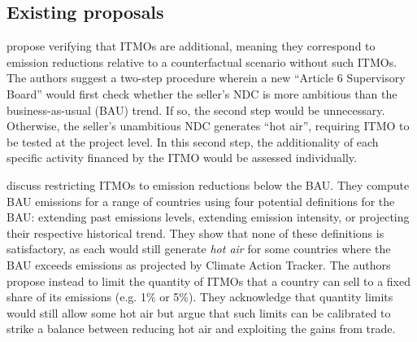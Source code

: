 \documentclass[12pt,english]{article}
\begin{document}
\subsection{Existing proposals\label{subsec:existing}}
\cite{michaelowa_additionality_2019} propose verifying that ITMOs are additional, meaning they correspond to emission reductions relative to a counterfactual scenario without such ITMOs. The authors suggest a two-step procedure wherein a new ``Article 6 Supervisory Board'' would first check whether the seller's NDC is more ambitious than the business-as-usual (BAU) trend. If so, the second step would be unnecessary. Otherwise, the seller's unambitious NDC generates ``hot air'', requiring ITMO to be tested at the project level. In this second step, the additionality of each specific activity financed by the ITMO would be assessed individually. 

\cite{la_hoz_theuer_when_2019} discuss restricting ITMOs to emission reductions below the BAU. They compute BAU emissions for a range of countries using four potential definitions for the BAU: extending past emissions levels, extending emission intensity, or projecting their respective historical trend. They show that none of these definitions is satisfactory, as each would still generate \textit{hot air} for some countries where the BAU exceeds emissions as projected by Climate Action Tracker. The authors propose instead to limit the quantity of ITMOs that a country can sell to a fixed share of its emissions (e.g. 1\% or 5\%). They acknowledge that quantity limits would still allow some hot air but argue that such limits can be calibrated to strike a balance between reducing hot air and exploiting the gains from %
trade. %
\end{document}
